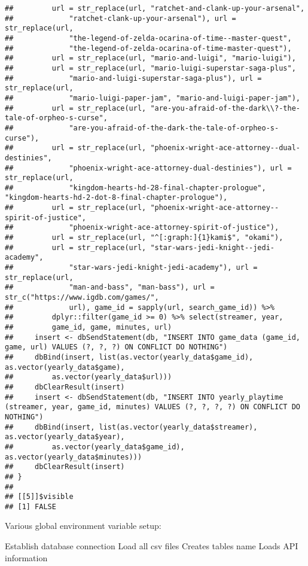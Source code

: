 \documentclass[
]{article}
\begin{document}
\begin{verbatim}
##         url = str_replace(url, "ratchet-and-clank-up-your-arsenal", 
##             "ratchet-clank-up-your-arsenal"), url = str_replace(url, 
##             "the-legend-of-zelda-ocarina-of-time--master-quest", 
##             "the-legend-of-zelda-ocarina-of-time-master-quest"), 
##         url = str_replace(url, "mario-and-luigi", "mario-luigi"), 
##         url = str_replace(url, "mario-luigi-superstar-saga-plus", 
##             "mario-and-luigi-superstar-saga-plus"), url = str_replace(url, 
##             "mario-luigi-paper-jam", "mario-and-luigi-paper-jam"), 
##         url = str_replace(url, "are-you-afraid-of-the-dark\\?-the-tale-of-orpheo-s-curse", 
##             "are-you-afraid-of-the-dark-the-tale-of-orpheo-s-curse"), 
##         url = str_replace(url, "phoenix-wright-ace-attorney--dual-destinies", 
##             "phoenix-wright-ace-attorney-dual-destinies"), url = str_replace(url, 
##             "kingdom-hearts-hd-28-final-chapter-prologue", "kingdom-hearts-hd-2-dot-8-final-chapter-prologue"), 
##         url = str_replace(url, "phoenix-wright-ace-attorney--spirit-of-justice", 
##             "phoenix-wright-ace-attorney-spirit-of-justice"), 
##         url = str_replace(url, "^[:graph:]{1}kami$", "okami"), 
##         url = str_replace(url, "star-wars-jedi-knight--jedi-academy", 
##             "star-wars-jedi-knight-jedi-academy"), url = str_replace(url, 
##             "man-and-bass", "man-bass"), url = str_c("https://www.igdb.com/games/", 
##             url), game_id = sapply(url, search_game_id)) %>% 
##         dplyr::filter(game_id >= 0) %>% select(streamer, year, 
##         game_id, game, minutes, url)
##     insert <- dbSendStatement(db, "INSERT INTO game_data (game_id, game, url) VALUES (?, ?, ?) ON CONFLICT DO NOTHING")
##     dbBind(insert, list(as.vector(yearly_data$game_id), as.vector(yearly_data$game), 
##         as.vector(yearly_data$url)))
##     dbClearResult(insert)
##     insert <- dbSendStatement(db, "INSERT INTO yearly_playtime (streamer, year, game_id, minutes) VALUES (?, ?, ?, ?) ON CONFLICT DO NOTHING")
##     dbBind(insert, list(as.vector(yearly_data$streamer), as.vector(yearly_data$year), 
##         as.vector(yearly_data$game_id), as.vector(yearly_data$minutes)))
##     dbClearResult(insert)
## }
## 
## [[5]]$visible
## [1] FALSE
\end{verbatim}

Various global environment variable setup:

Establish database connection Load all csv files Creates tables name
Loads API information
\end{document}
